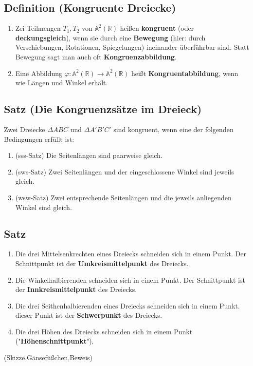 \subsection[Kongruente Dreiecke]{Definition (Kongruente Dreiecke)}	

	\begin{enumerate}
	\item Zei Teilmengen $T_1,T_2$ von $\mathbb{A}^2(\mathbb{R})$ heißen \textbf{kongruent} 
	(oder \textbf{deckungsgleich}), wenn sie durch eine \textbf{Bewegung} (hier: durch Verschiebungen,
	Rotationen, Spiegelungen) ineinander überführbar sind. Statt Bewegung sagt man auch oft
	\textbf{Kongruenzabbildung}.
	
	\item Eine Abbildung $\varphi:\mathbb{A}^2(\mathbb{R})\rightarrow\mathbb{A}^2(\mathbb{R})$ heißt 
	\textbf{Kongruentabbildung}, wenn wie Längen und Winkel erhält.
	
	\end{enumerate}
	
	
\subsection[Die Kongruenzsätze im Dreieck]{Satz (Die Kongruenzsätze im Dreieck)}	
	
	Zwei Dreiecke $\Delta ABC$ und $\Delta A'B'C'$ sind kongruent, wenn eine der folgenden Bedingungen erfüllt
	ist:
	
	\begin{enumerate}
	\item (sss-Satz) Die Seitenlängen sind paarweise gleich.
	\item (sws-Satz) Zwei Seitenlängen und der eingeschlossene Winkel sind jeweils gleich.
	\item (wsw-Satz) Zwei entsprechende Seitenlängen und die jeweils anliegenden Winkel sind gleich.
	\end{enumerate}
	
	
\subsection[Besondere Punkte im Dreieck]{Satz}

	\begin{enumerate}
	\item Die drei Mittelsenkrechten eines Dreiecks schneiden sich in einem Punkt. Der Schnittpunkt ist der 
	\textbf{Umkreismittelpunkt} des Dreiecks.
	\item Die Winkelhalbierenden schneiden sich in einem Punkt. Der Schnittpunkt ist der
	\textbf{Innkreismittelpunkt} des Dreiecks.
	\item Die drei Seithenhalbierenden eines Dreiecks schneiden sich in einem Punkt. dieser Punkt ist der
	\textbf{Schwerpunkt} des Dreiecks.
	\item Die drei Höhen des Dreiecks schneiden sich in einem Punkt ("\textbf{Höhenschnittpunkt}").	
	\end{enumerate}\todo(Skizze,Gänsefüßchen,Beweis)
	
